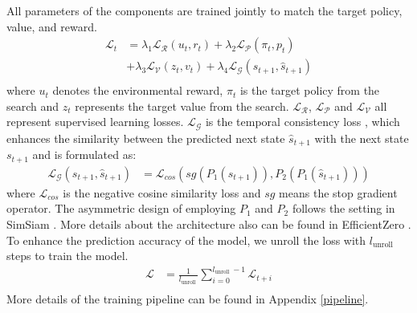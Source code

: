 All parameters of the components are trained jointly to match the target policy, value, and reward. 
\begin{equation}
\label{loss}
    \begin{split}
        \mathcal{L}_t &= \lambda_1\mathcal{L}_\mathcal{R}(u_t,r_t)+\lambda_2\mathcal{L}_\mathcal{P}(\pi_t,p_t)\\ &+\lambda_3\mathcal{L}_\mathcal{V}(z_t,v_t)+\lambda_4\mathcal{L}_\mathcal{G}(s_{t+1},\hat{s}_{t+1}) \\
    \end{split}
\end{equation}
where $u_t$ denotes the environmental reward, $\pi_t$ is the target policy from the search and $z_t$ represents the target value from the search. $\mathcal{L}_\mathcal{R}$, $\mathcal{L}_\mathcal{P}$ and $\mathcal{L}_\mathcal{V}$ all represent supervised learning losses.
$\mathcal{L}_\mathcal{G}$ is the temporal consistency loss \cite{schwarzer2020data}, which enhances the similarity between the predicted next state $\hat{s}_{t+1}$ with the next state $s_{t+1}$ and is formulated as: 
\begin{equation}
\label{loss}
    \begin{split}
        \mathcal{L}_{\mathcal{G}}\left(s_{t+1}, \hat{s}_{t+1}\right)&=\mathcal{L}_{cos}\left(s g\left(P_1\left(s_{t+1}\right)\right), P_2\left(P_1\left(\hat{s}_{t+1}\right)\right)\right)
    \end{split}
\end{equation}
where $\mathcal{L}_{cos}$ is the negative cosine similarity loss and $sg$ means the stop gradient operator.
The asymmetric design of employing $P_1$ and $P_2$ follows the setting in SimSiam \citep{chen2021exploring}. More details about the architecture also can be found in EfficientZero \citep{ye2021mastering}.
To enhance the prediction accuracy of the model, we unroll the loss with $l_{\text {unroll }}$ steps to train the model.
\begin{equation}
\label{loss}
    \begin{split}
    \mathcal{L} &=\frac{1}{l_{\text {unroll }}} \sum_{i=0}^{l_{\text {unroll }}-1} \mathcal{L}_{t+i} \\
    \end{split}
\end{equation}
More details of the training pipeline can be found in Appendix \ref{pipeline}.





